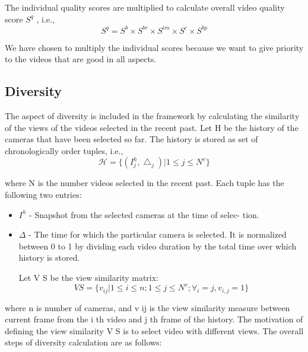 \documentclass{clsfile}
\begin{document}
The individual quality scores are multiplied to calculate overall
video quality score $S^q$ , i.e.,
\begin{equation}
    S^q = S^b {\times} S^{br} {\times} S^{im} {\times} S^c {\times} S^{bp}
\end{equation}

We have chosen to multiply the individual scores because we
want to give priority to the videos that are good in all aspects.



\subsection{Diversity}
The aspect of diversity is included in the framework by calculating the similarity of the views of the videos selected in the recent
past. Let H be the history of the cameras that have been selected
so far. The history is stored as set of chronologically order tuples,
i.e.,
\begin{equation}
    \mathcal{H} = \{ (I^h_j,\bigtriangleup_j)|1\leqslant j \leqslant N^v \}
\end{equation}

where N is the number videos selected in the recent past. Each
tuple has the following two entries:

\begin{itemize}
\item $I^h$ - Snapshot from the selected cameras at the time of selec-
tion.

\item $\Delta$ - The time for which the particular camera is selected. It
is normalized between 0 to 1 by dividing each video duration
by the total time over which history is stored.

Let V S be the view similarity matrix:
\begin{equation}
    VS = \{ v_{ij}|1 \leqslant i \leqslant n; 1 \leqslant j \leqslant N^v;  \forall_i=j,v_{i,j}  =1 \}
\end{equation}
\end{itemize}

where n is number of cameras, and v ij is the view similarity
measure between current frame from the i th video and j th frame
of the history. The motivation of defining the view similarity V S is
to select video with different views. The overall steps of diversity
calculation are as follows:
\end{document}
